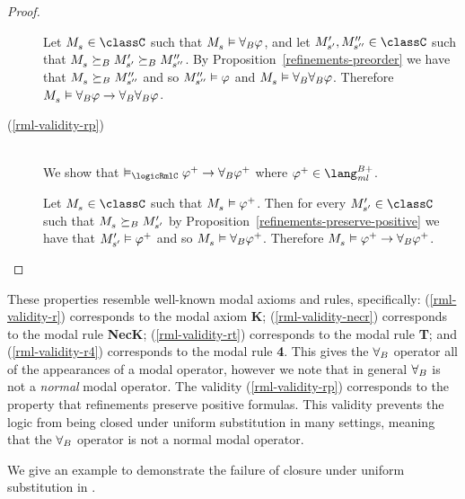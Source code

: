 \begin{proof}
\begin{description}
        Let $\kPModel{\kStateS} \in \classC$
        such that $\kPModel{\kStateS} \entails \allrefsBs \phi$,
        and let $\kPModelP{\kStateSP}, \kPModelPP{\kStateSPP} \in \classC$
        such that $\kPModel{\kStateS} \simulatesBs \kPModelP{\kStateSP} \simulatesBs \kPModelPP{\kStateSPP}$.
        By Proposition~\ref{refinements-preorder} we have that $\kPModel{\kStateS} \simulatesBs \kPModelPP{\kStateSPP}$ and so ${M^{\prime\prime}_{{s}^{\prime\prime}}} \vDash \varphi$ and $\kPModel{\kStateS} \entails \allrefsBs \allrefsBs \phi$.
        Therefore $\kPModel{\kStateS} \entails \allrefsBs \phi \implies \allrefsBs \allrefsBs \phi$.
    \item[(\ref{rml-validity-rp})] \hfill \\
        We show that $\entails_\logicRmlC \phi^+ \implies \allrefsBs \phi^+$ where $\phi^+ \in \langMlPlusBs$.

        Let $\kPModel{\kStateS} \in \classC$
        such that $\kPModel{\kStateS} \entails \phi^+$.
        Then for every $\kPModelP{\kStateSP} \in \classC$
        such that $\kPModel{\kStateS} \simulatesBs \kPModelP{\kStateSP}$
        by Proposition~\ref{refinements-preserve-positive} we have that ${M^{\prime}_{{s}^{\prime}}} \vDash \varphi^+$ and so $\kPModel{\kStateS} \entails \allrefsBs \phi^+$.
        Therefore $\kPModel{\kStateS} \entails \phi^+ \implies \allrefsBs \phi^+$.
\end{description}
\end{proof}

These properties resemble well-known modal axioms and rules, specifically:
(\ref{rml-validity-r}) corresponds to the modal axiom {\bf K};
(\ref{rml-validity-necr}) corresponds to the modal rule {\bf NecK};
(\ref{rml-validity-rt}) corresponds to the modal rule {\bf T}; and
(\ref{rml-validity-r4}) corresponds to the modal rule {\bf 4}.
This gives the ${\forall_{B}}$ operator all of the appearances of a modal operator, however we note that in general ${\forall_{B}}$ is not a {\em normal} modal operator.
The validity (\ref{rml-validity-rp}) corresponds to the property that refinements preserve positive formulas.
This validity prevents the logic from being closed under uniform substitution in many settings, meaning that the ${\forall_{B}}$ operator is not a normal modal operator.

We give an example to demonstrate the failure of closure under uniform substitution in \logicRmlK{}.

